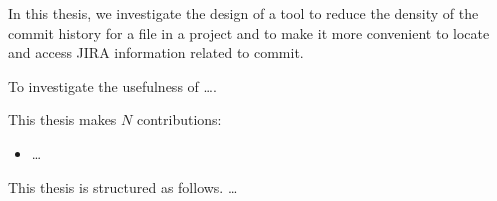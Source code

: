 In this thesis, we investigate the design of a tool to reduce the density of the commit history for a file in a project and to make it more convenient to locate and access JIRA information related to commit. 

To investigate the usefulness of \dots .

This thesis makes $N$ contributions:
\begin{itemize}
	\item \dots
\end{itemize}

This thesis is structured as follows. \dots

\endinput

Any text after an \endinput is ignored.
You could put scraps here or things in progress.
